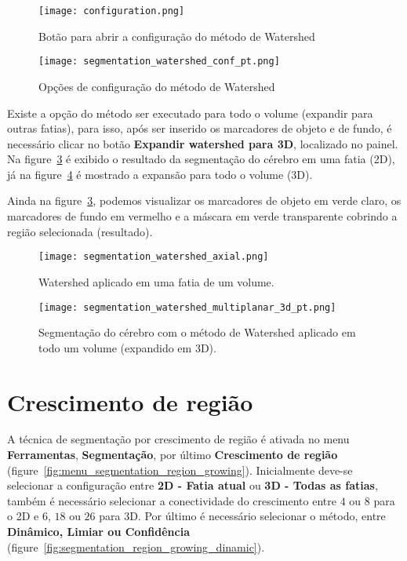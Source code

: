 \begin{figure}[!htb]
\centering
\texttt{[image: configuration.png]}
\caption{Botão para abrir a configuração do método de Watershed}
\label{fig:watershed_conf}
\end{figure}

\begin{figure}[!htb]
\centering
\texttt{[image: segmentation\_watershed\_conf\_pt.png]}
\caption{Opções de configuração do método de Watershed}
\label{fig:watershed_janela_conf}
\end{figure}

Existe a opção do método ser executado para todo o volume (expandir para outras fatias), para isso, após ser inserido os marcadores de objeto e de fundo, é necessário clicar no botão \textbf{Expandir watershed para 3D}, localizado no painel. Na figure~\ref{fig:watershed_2d} é exibido o resultado da segmentação do cérebro em uma fatia (2D), já na figure~\ref{fig:watershed_3d} é mostrado a expansão para todo o volume (3D). 

Ainda na figure~\ref{fig:watershed_2d}, podemos visualizar os marcadores de objeto em verde claro, os marcadores de fundo em vermelho e a máscara em verde transparente cobrindo a região selecionada (resultado).

\begin{figure}[!htb]
\centering
\texttt{[image: segmentation\_watershed\_axial.png]}
\caption{Watershed aplicado em uma fatia de um volume.}
\label{fig:watershed_2d}
\end{figure}

\begin{figure}[!htb]
\centering
\texttt{[image: segmentation\_watershed\_multiplanar\_3d\_pt.png]}
\caption{Segmentação do cérebro com o método de Watershed aplicado em todo um volume (expandido em 3D).}
\label{fig:watershed_3d}
\end{figure}

\section{Crescimento de região}

A técnica de segmentação por crescimento de região é ativada no menu \textbf{Ferramentas}, \textbf{Segmentação}, por último \textbf{Crescimento de região} (figure~\ref{fig:menu_segmentation_region_growing}). Inicialmente deve-se selecionar a configuração entre \textbf{2D - Fatia atual} ou \textbf{3D - Todas as fatias}, também é necessário selecionar a conectividade do crescimento entre $4$ ou $8$ para o 2D e $6$, $18$ ou $26$ para 3D. Por último é necessário selecionar o método, entre \textbf{Dinâmico, Limiar ou Confidência} (figure~\ref{fig:segmentation_region_growing_dinamic}).

